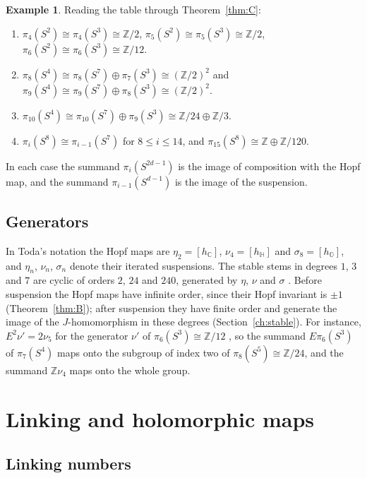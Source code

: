 \documentclass[11pt]{amsart}
\numberwithin{equation}{section}
\theoremstyle{plain}
\theoremstyle{definition}
\newtheorem{example}[theorem]{Example}
\theoremstyle{remark}
\newcommand{\C}{\mathbb{C}}
\newcommand{\Hq}{\mathbb{H}}
\newcommand{\Oc}{\mathbb{O}}
\newcommand{\Z}{\mathbb{Z}}
\begin{document}
\begin{example}\label{ex:derived}
Reading the table through Theorem~\ref{thm:C}:
\begin{enumerate}[label=\textup{(\alph*)}]
\item $\pi_4(S^2)\cong\pi_4(S^3)\cong\Z/2$, $\pi_5(S^2)\cong\pi_5(S^3)\cong\Z/2$, $\pi_6(S^2)\cong\pi_6(S^3)\cong\Z/12$.
\item $\pi_8(S^4)\cong\pi_8(S^7)\oplus\pi_7(S^3)\cong(\Z/2)^2$ and $\pi_9(S^4)\cong\pi_9(S^7)\oplus\pi_8(S^3)\cong(\Z/2)^2$.
\item $\pi_{10}(S^4)\cong\pi_{10}(S^7)\oplus\pi_9(S^3)\cong\Z/24\oplus\Z/3$.
\item $\pi_{i}(S^8)\cong\pi_{i-1}(S^7)$ for $8\le i\le14$, and $\pi_{15}(S^8)\cong\Z\oplus\Z/120$.
\end{enumerate}
In each case the summand $\pi_i(S^{2d-1})$ is the image of composition with the Hopf map, and the summand $\pi_{i-1}(S^{d-1})$ is the image of the suspension.
\end{example}

\subsection{Generators}\label{sec:generators}

In Toda's notation \cite{Tod62} the Hopf maps are $\eta_2=[h_\C]$, $\nu_4=[h_\Hq]$ and $\sigma_8=[h_\Oc]$, and $\eta_n$, $\nu_n$, $\sigma_n$ denote their iterated suspensions. The stable stems in degrees $1$, $3$ and $7$ are cyclic of orders $2$, $24$ and $240$, generated by $\eta$, $\nu$ and $\sigma$ \cite[Chapters~V and XIV]{Tod62}. Before suspension the Hopf maps have infinite order, since their Hopf invariant is $\pm1$ (Theorem~\ref{thm:B}); after suspension they have finite order and generate the image of the $J$-homomorphism in these degrees (Section~\ref{ch:stable}). For instance, $E^2\nu'=2\nu_5$ for the generator $\nu'$ of $\pi_6(S^3)\cong\Z/12$ \cite[Chapter~V]{Tod62}, so the summand $E\pi_6(S^3)$ of $\pi_7(S^4)$ maps onto the subgroup of index two of $\pi_8(S^5)\cong\Z/24$, and the summand $\Z\nu_4$ maps onto the whole group.
\section{Linking and holomorphic maps}\label{ch:linking}

\subsection{Linking numbers}\label{sec:lk}
\end{document}

